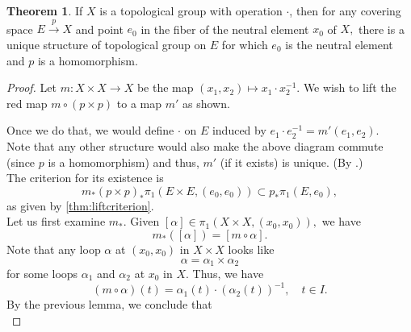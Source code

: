 \documentclass[12pt]{article}
\theoremstyle{definition}
\newtheorem{thm}{Theorem}
\numberwithin{thm}{section}
\begin{document}
\begin{thm}
	If $X$ is a topological group with operation $\cdot$, then for any covering space $E \overset{p}{\longrightarrow} X$ and point $e_0$ in the fiber of the neutral element $x_0$ of $X,$ there is a unique structure of topological group on $E$ for which $e_0$ is the neutral element and $p$ is a homomorphism.
\end{thm}
\begin{proof} 
	Let $m:X\times X \to X$ be the map $(x_1, x_2) \mapsto x_1\cdot x_2^{-1}.$ We wish to lift the red map $m\circ(p \times p)$ to a map $m'$ as shown.
	\begin{center}
	\end{center}
	Once we do that, we would define $\cdot$ on $E$ induced by $e_1\cdot e_2^{-1} = m'(e_1, e_2).$ \\
	Note that any other structure would also make the above diagram commute (since $p$ is a homomorphism) and thus, $m'$ (if it exists) is unique. (By .)\\
	The criterion for its existence is 
	\begin{equation*} 
		m_*(p \times p)_*\pi_1(E \times E, (e_0, e_0)) \subset p_*\pi_1(E, e_0),
	\end{equation*}
	as given by \cref{thm:liftcriterion}.\\
	Let us first examine $m_*.$ Given $[\alpha] \in \pi_1(X\times X, (x_0, x_0)),$ we have
	\begin{equation*} 
		m_*([\alpha]) = [m \circ \alpha].
	\end{equation*}
	Note that any loop $\alpha$ at $(x_0, x_0)$ in $X \times X$ looks like
	\begin{equation*} 
		\alpha = \alpha_1 \times \alpha_2
	\end{equation*}
	for some loops $\alpha_1$ and $\alpha_2$ at $x_0$ in $X.$ Thus, we have
	\begin{equation*} 
		(m\circ\alpha)(t) = \alpha_1(t)\cdot(\alpha_2(t))^{-1}, \quad t \in I.	
	\end{equation*}
	By the previous lemma, we conclude that
	\begin{equation*} 

\end{equation*}
\end{proof}
\end{document}
